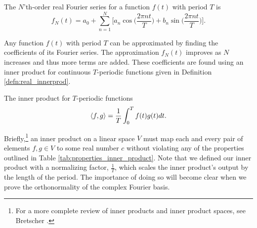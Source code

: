 \begin{definition}{The $N$'th-order real Fourier series for a function $f(t)$ with period $T$ is}
    $$f_N(t)=a_0+\sum_{n=1}^{N}{\Bigg[a_n \cos\bigg(\frac{2\pi nt}{T}\bigg)+b_n \sin\bigg(\frac{2\pi nt}{T}\bigg)\Bigg]}.$$
\end{definition}

\par \bigskip Any function $f(t)$ with period $T$ can be approximated by finding the coefficients of its Fourier series. The approximation $f_N(t)$ improves as $N$ increases and thus more terms are added.\cite{Ryan} These coefficients are found using an inner product for continuous $T$-periodic functions given in Definition \ref{defn:real_innerprod}.

\newpage

\begin{definition}{The inner product for $T$-periodic functions}
    $$\langle f,g \rangle = \frac{1}{T} \int_0^T f(t)g(t)dt.$$
    \label{defn:real_innerprod}
\end{definition}

\par Briefly,\footnote{For a more complete review of inner products and inner product spaces, see Bretscher .} an inner product on a linear space $V$ must map each and every pair of elements $f,g \in V$ to some real number $c$ without violating any of the properties outlined in Table \ref{tab:properties_inner_product}.\cite{Bretscher} Note that we defined our inner product with a normalizing factor, $\frac{1}{T}$, which scales the inner product's output by the length of the period. The importance of doing so will become clear when we prove the orthonormality of the complex Fourier basis.

